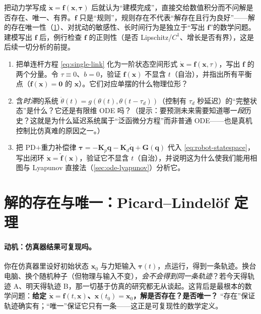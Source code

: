 \begin{pitfall}
把动力学写成 $\dot{\mathbf{x}}=\mathbf{f}(\mathbf{x},\boldsymbol{\tau})$ 后就认为“建模完成”，直接交给数值积分而不问解是否存在、唯一、有界。$\mathbf{f}$ 只是“规则”，规则存在不代表“解存在且行为良好”——解的存在唯一性（\cref{sec:ode-picard}）、对扰动的敏感性、长时间行为是独立于“写出 $\mathbf{f}$”的数学问题。建模写出 $\mathbf{f}$ 后，例行检查 $\mathbf{f}$ 的正则性（是否 Lipschitz/$C^1$、增长是否有界），这是后续一切分析的前提。
\end{pitfall}

\begin{practice}
\begin{enumerate}
  \item 把单连杆方程 \cref{eq:single-link} 化为一阶状态空间形式 $\dot{\mathbf{x}}=\mathbf{f}(\mathbf{x},\tau)$，写出 $\mathbf{f}$ 的两个分量。令 $\tau\equiv0$、$b=0$，验证 $\mathbf{f}(\mathbf{x})$ 不显含 $t$（自治），并指出所有平衡点（$\mathbf{f}(\mathbf{x})=\mathbf{0}$ 的 $\mathbf{x}$）。它们对应单摆的什么物理位形？
  \item 含\emph{时滞}的系统 $\ddot\theta(t)=g(\theta(t),\theta(t-\tau_d))$（控制有 $\tau_d$ 秒延迟）的“完整状态”是什么？它还是有限维 ODE 吗？（提示：要预测未来需要知道哪一\emph{段}历史？这就是为什么延迟系统属于“泛函微分方程”而非普通 ODE——也是真机控制比仿真难的原因之一。）
  \item 把 PD$+$重力补偿律 $\boldsymbol{\tau}=-\mathbf{K}_p\mathbf{q}-\mathbf{K}_d\dot{\mathbf{q}}+\mathbf{G}(\mathbf{q})$ 代入 \cref{eq:robot-statespace}，写出闭环 $\dot{\mathbf{x}}=\tilde{\mathbf{f}}(\mathbf{x})$，验证它不显含 $t$（自治），并说明这为什么使我们能用相图与 Lyapunov 直接法（\cref{sec:ode-lyapunov}）分析它。
\end{enumerate}
\end{practice}

\section{解的存在与唯一：Picard--Lindelöf 定理}
\label{sec:ode-picard}

\paragraph{动机：仿真器结果可复现吗。}
你在仿真器里设好初始状态 $\mathbf{x}_0$ 与力矩输入 $\boldsymbol{\tau}(t)$，点运行，得到一条轨迹。换台电脑、换个随机种子（但物理与输入不变），\emph{会不会得到同一条轨迹}？若今天得轨迹 A、明天得轨迹 B，那一切基于仿真的研究都无从谈起。这背后是最根本的数学问题：\textbf{给定 $\dot{\mathbf{x}}=\mathbf{f}(t,\mathbf{x})$、$\mathbf{x}(t_0)=\mathbf{x}_0$，解是否存在？是否唯一？} “存在”保证轨迹确实有；“唯一”保证它只有一条——这正是可复现性的数学定义。

